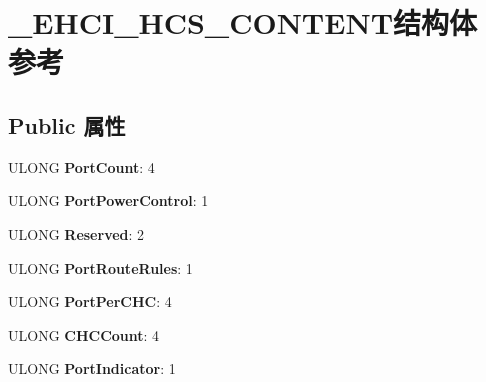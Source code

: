 \hypertarget{struct___e_h_c_i___h_c_s___c_o_n_t_e_n_t}{}\section{\+\_\+\+E\+H\+C\+I\+\_\+\+H\+C\+S\+\_\+\+C\+O\+N\+T\+E\+N\+T结构体 参考}
\label{struct___e_h_c_i___h_c_s___c_o_n_t_e_n_t}
\subsection*{Public 属性}
\begin{DoxyCompactItemize}
\item 
\mbox{\label{struct___e_h_c_i___h_c_s___c_o_n_t_e_n_t_a857f3abbd31542d616fe60e42eee4657}} 
U\+L\+O\+NG {\bfseries Port\+Count}\+: 4
\item 
\mbox{\label{struct___e_h_c_i___h_c_s___c_o_n_t_e_n_t_a162fd435746a61a8cfa1b1eb8b4c2f3a}} 
U\+L\+O\+NG {\bfseries Port\+Power\+Control}\+: 1
\item 
\mbox{\label{struct___e_h_c_i___h_c_s___c_o_n_t_e_n_t_adb5711c00834d5f6976cc9faee74924a}} 
U\+L\+O\+NG {\bfseries Reserved}\+: 2
\item 
\mbox{\label{struct___e_h_c_i___h_c_s___c_o_n_t_e_n_t_a25395f8496306fc8d05e6b2de2ad5959}} 
U\+L\+O\+NG {\bfseries Port\+Route\+Rules}\+: 1
\item 
\mbox{\label{struct___e_h_c_i___h_c_s___c_o_n_t_e_n_t_a0ce984a959a25f1a4ee2c2d8dd7eed0a}} 
U\+L\+O\+NG {\bfseries Port\+Per\+C\+HC}\+: 4
\item 
\mbox{\label{struct___e_h_c_i___h_c_s___c_o_n_t_e_n_t_a1ff299d173a2145e6f20bb080306e4f5}} 
U\+L\+O\+NG {\bfseries C\+H\+C\+Count}\+: 4
\item 
\mbox{\label{struct___e_h_c_i___h_c_s___c_o_n_t_e_n_t_a2ab055494366b41176fd7f57257d8732}} 
U\+L\+O\+NG {\bfseries Port\+Indicator}\+: 1

\end{DoxyCompactItemize}
